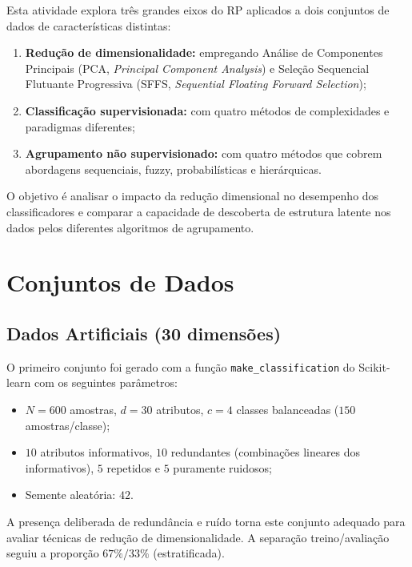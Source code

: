 \documentclass[12pt, a4paper]{article}
\begin{document}
Esta atividade explora três grandes eixos do RP aplicados a dois conjuntos de dados de características distintas:

\begin{enumerate}[label=(\roman*)]
    \item \textbf{Redução de dimensionalidade:} empregando Análise de Componentes Principais (PCA, \emph{Principal Component Analysis}) e Seleção Sequencial Flutuante Progressiva (SFFS, \emph{Sequential Floating Forward Selection});
    \item \textbf{Classificação supervisionada:} com quatro métodos de complexidades e paradigmas diferentes;
    \item \textbf{Agrupamento não supervisionado:} com quatro métodos que cobrem abordagens sequenciais, fuzzy, probabilísticas e hierárquicas.
\end{enumerate}

O objetivo é analisar o impacto da redução dimensional no desempenho dos classificadores e comparar a capacidade de descoberta de estrutura latente nos dados pelos diferentes algoritmos de agrupamento.

\section{Conjuntos de Dados}
\label{sec:dados}

\subsection{Dados Artificiais (30 dimensões)}

O primeiro conjunto foi gerado com a função \texttt{make\_classification} do Scikit-learn com os seguintes parâmetros:

\begin{itemize}
    \item $N = 600$ amostras, $d = 30$ atributos, $c = 4$ classes balanceadas ($150$ amostras/classe);
    \item $10$ atributos informativos, $10$ redundantes (combinações lineares dos informativos), $5$ repetidos e $5$ puramente ruidosos;
    \item Semente aleatória: $42$.
\end{itemize}

A presença deliberada de redundância e ruído torna este conjunto adequado para avaliar técnicas de redução de dimensionalidade. A separação treino/avaliação seguiu a proporção $67\%/33\%$ (estratificada).
\end{document}
